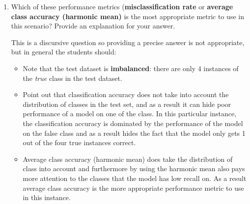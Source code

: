 \documentclass[--SOLUTION-OPTION--]{ditpaper}
\begin{document}
\begin{enumerate}
\begin{enumerate}
\item Which of these performance metrics (\textbf{misclassification rate} or \textbf{average class accuracy (harmonic mean)} is the most appropriate metric to use in this scenario? Provide an explanation for your answer.
	\begin{answer}
This is a discursive question so providing a precise answer is not appropriate, but in general the students should:
	\begin{itemize}
		\item Note that the test dataset is \textbf{imbalanced}: there are only 4 instances of the \textit{true} class in the test dataset.
		\item Point out that classification accuracy does not take into account the distribution of classes in the test set, and as a result it can hide poor performance of a model on one of the class. In this particular instance, the classification accuracy is dominated by the performance of the model on the false class and as a result hides the fact that the model only gets 1 out of the four true instances correct.
		\item Average class accuracy (harmonic mean) does take the distribution of class into account and furthermore by using the harmonic mean also pays more attention to the classes that the model has low recall on. As a result average class accuracy is the more appropriate performance metric to use in this instance. 
	\end{itemize}
	\end{answer}
	\end{enumerate}
\end{enumerate} 
\end{document}

